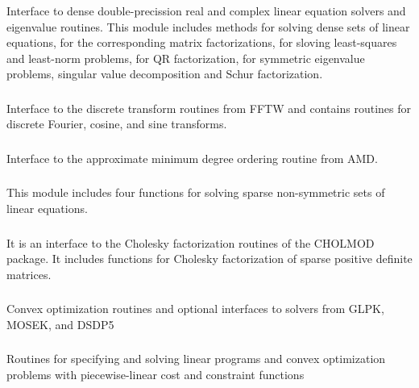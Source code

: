 \subsubsection*{}
Interface to dense double-precission real and complex linear equation solvers and eigenvalue routines. This module includes methods for solving dense sets of linear equations, for the corresponding matrix factorizations, for sloving least-squares and least-norm problems, for QR factorization, for symmetric eigenvalue problems, singular value decomposition and Schur factorization.

\subsubsection*{}
Interface to the discrete transform routines from FFTW and contains routines for discrete Fourier, cosine, and sine transforms.

\subsubsection*{}
Interface to the approximate minimum degree ordering routine from AMD.

\subsubsection*{}
This module includes four functions for solving sparse non-symmetric sets of linear equations.
\subsubsection*{}
It is an interface to the Cholesky factorization routines of the CHOLMOD package. It includes functions for Cholesky factorization of sparse positive definite matrices.

\subsubsection*{}
Convex optimization routines and optional interfaces to solvers from GLPK, MOSEK, and DSDP5 

\subsubsection*{}
Routines for specifying and solving linear programs and convex optimization problems with piecewise-linear cost and constraint functions

